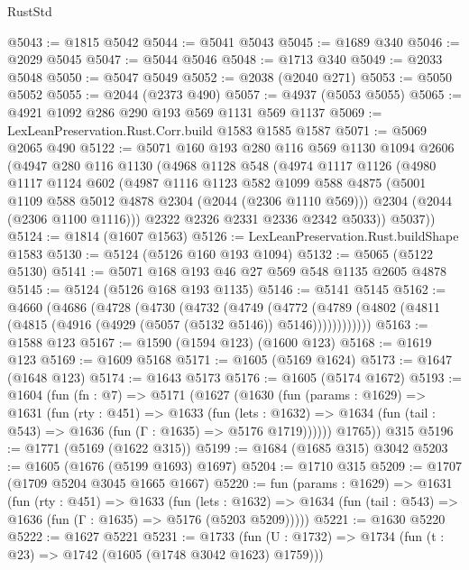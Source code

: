 \begin{lexlean}{RustStd}
\begin{coremodule}
@5043 := @1815 @5042
@5044 := @5041 @5043
@5045 := @1689 @340
@5046 := @2029 @5045
@5047 := @5044 @5046
@5048 := @1713 @340
@5049 := @2033 @5048
@5050 := @5047 @5049
@5052 := @2038 (@2040 @271)
@5053 := @5050 @5052
@5055 := @2044 (@2373 @490)
@5057 := @4937 (@5053 @5055)
@5065 := @4921 @1092 @286 @290 @193 @569 @1131 @569 @1137
@5069 := LexLeanPreservation.Rust.Corr.build @1583 @1585 @1587
@5071 := @5069 @2065 @490
@5122 := @5071
    @160
    @193
    @280
    @116
    @569
    @1130
    @1094
    @2606
    (@4947
      @280
      @116
      @1130
      (@4968
        @1128
        @548
        (@4974
          @1117
          @1126
          (@4980
            @1117
            @1124
            @602
            (@4987
              @1116
              @1123
              @582
              @1099
              @588
              @4875
              (@5001 @1109 @588 @5012 @4878 @2304 (@2044 (@2306 @1110 @569)))
              @2304
              (@2044 (@2306 @1100 @1116)))
            @2322
            @2326
            @2331
            @2336
            @2342
            @5033))
        @5037))
@5124 := @1814 (@1607 @1563)
@5126 := LexLeanPreservation.Rust.buildShape @1583
@5130 := @5124 (@5126 @160 @193 @1094)
@5132 := @5065 (@5122 @5130)
@5141 := @5071 @168 @193 @46 @27 @569 @548 @1135 @2605 @4878
@5145 := @5124 (@5126 @168 @193 @1135)
@5146 := @5141 @5145
@5162 := @4660
    (@4686
      (@4728
        (@4730
          (@4732
            (@4749
              (@4772
                (@4789 (@4802 (@4811 (@4815 (@4916 (@4929 (@5057 (@5132 @5146)) @5146))))))))))))
@5163 := @1588 @123
@5167 := @1590 (@1594 @123) (@1600 @123)
@5168 := @1619 @123
@5169 := @1609 @5168
@5171 := @1605 (@5169 @1624)
@5173 := @1647 (@1648 @123)
@5174 := @1643 @5173
@5176 := @1605 (@5174 @1672)
@5193 := @1604
    (fun (fn : @7) =>
    @5171
      (@1627
        (@1630
          (fun (params : @1629) =>
          @1631
            (fun (rty : @451) =>
            @1633
              (fun (lets : @1632) =>
              @1634 (fun (tail : @543) => @1636 (fun (Γ : @1635) => @5176 @1719))))))
        @1765))
    @315
@5196 := @1771 (@5169 (@1622 @315))
@5199 := @1684 (@1685 @315) @3042
@5203 := @1605 (@1676 (@5199 @1693) @1697)
@5204 := @1710 @315
@5209 := @1707 (@1709 @5204 @3045 @1665 @1667)
@5220 := fun (params : @1629) =>
  @1631
    (fun (rty : @451) =>
    @1633
      (fun (lets : @1632) =>
      @1634 (fun (tail : @543) => @1636 (fun (Γ : @1635) => @5176 (@5203 @5209)))))
@5221 := @1630 @5220
@5222 := @1627 @5221
@5231 := @1733 (fun (U : @1732) => @1734 (fun (t : @23) => @1742 (@1605 (@1748 @3042 @1623) @1759)))

\end{coremodule}
\end{lexlean}
